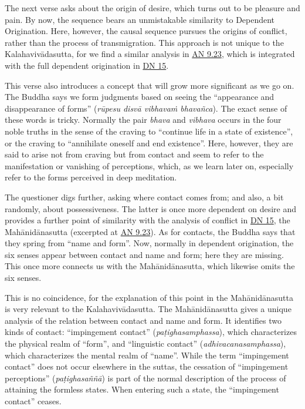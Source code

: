 \documentclass[12pt,openany]{book}%
\begin{document}
The next verse asks about the origin of desire, which turns out to be pleasure and pain. By now, the sequence bears an unmistakable similarity to Dependent Origination. Here, however, the causal sequence pursues the origins of conflict, rather than the process of transmigration. This approach is not unique to the \textsanskrit{Kalahavivādasutta}, for we find a similar analysis in \href{https://suttacentral.net/an9.23/en/sujato}{AN 9.23}, which is integrated with the full dependent origination in \href{https://suttacentral.net/dn15/en/sujato}{DN 15}.

This verse also introduces a concept that will grow more significant as we go on. The Buddha says we form judgments based on seeing the “appearance and disappearance of forms” (\textit{\textsanskrit{rūpesu} \textsanskrit{disvā} \textsanskrit{vibhavaṁ} \textsanskrit{bhavañca}}). The exact sense of these words is tricky. Normally the pair \textit{bhava} and \textit{vibhava} occurs in the four noble truths in the sense of the craving to “continue life in a state of existence”, or the craving to “annihilate oneself and end existence”. Here, however, they are said to arise not from craving but from contact and seem to refer to the manifestation or vanishing of perceptions, which, as we learn later on, especially refer to the forms perceived in deep meditation.

The questioner digs further, asking where contact comes from; and also, a bit randomly, about possessiveness. The latter is once more dependent on desire and provides a further point of similarity with the analysis of conflict in \href{https://suttacentral.net/dn15/en/sujato}{DN 15}, the \textsanskrit{Mahānidānasutta} (excerpted at \href{https://suttacentral.net/an9.23/en/sujato}{AN 9.23}). As for contacts, the Buddha says that they spring from “name and form”. Now, normally in dependent origination, the six senses appear between contact and name and form; here they are missing. This once more connects us with the \textsanskrit{Mahānidānasutta}, which likewise omits the six senses.

This is no coincidence, for the explanation of this point in the \textsanskrit{Mahānidānasutta} is very relevant to the \textsanskrit{Kalahavivādasutta}. The \textsanskrit{Mahānidānasutta} gives a unique analysis of the relation between contact and name and form. It identifies two kinds of contact: “impingement contact” (\textit{\textsanskrit{paṭighasamphassa}}), which characterizes the physical realm of “form”, and “linguistic contact” (\textit{adhivacanasamphassa}), which characterizes the mental realm of “name”. While the term “impingement contact” does not occur elsewhere in the suttas, the cessation of “impingement perceptions” (\textit{\textsanskrit{paṭighasaññā}}) is part of the normal description of the process of attaining the formless states. When entering such a state, the “impingement contact” ceases.
\end{document}
